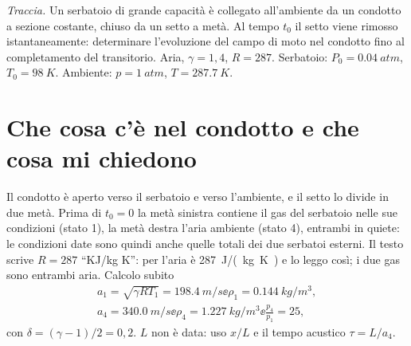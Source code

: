 

\graphicspath{{../../svolgimenti/1975-01-01_E01_condotto_serbatoio_ambiente/figure/}}

\newcommand{\uma}{u-a}
\newcommand{\upa}{u+a}



\maketitle

\emph{Traccia.} Un serbatoio di grande capacità è collegato all'ambiente da un condotto a sezione costante, chiuso
da un setto a metà. Al tempo $t_0$ il setto viene rimosso istantaneamente: determinare l'evoluzione del campo di
moto nel condotto fino al completamento del transitorio. Aria, $\gamma=1{,}4$, $R=287$. Serbatoio:
$P_0=\SI{0.04}{atm}$, $T_0=\SI{98}{K}$. Ambiente: $p=\SI{1}{atm}$, $T=\SI{287.7}{K}$.

\section*{Che cosa c'è nel condotto e che cosa mi chiedono}
Il condotto è aperto verso il serbatoio e verso l'ambiente, e il setto lo divide in due metà. Prima di $t_0=0$ la
metà sinistra contiene il gas del serbatoio nelle sue condizioni (stato 1), la metà destra l'aria ambiente (stato 4),
entrambi in quiete: le condizioni date sono quindi anche quelle totali dei due serbatoi esterni. Il testo scrive
$R=287$ ``KJ/kg K'': per l'aria è \SI{287}{J/(kg.K)} e lo leggo così; i due gas sono entrambi aria. Calcolo subito
\begin{gather*}
  a_1=\sqrt{\gamma RT_1}=\SI{198.4}{m/s} \ee \rho_1=\SI{0.144}{kg/m^3},\\
  a_4=\SI{340.0}{m/s} \ee \rho_4=\SI{1.227}{kg/m^3} \ee \frac{p_4}{p_1}=25,
\end{gather*}
con $\delta=(\gamma-1)/2=0{,}2$. $L$ non è data: uso $x/L$ e il tempo acustico $\tau=L/a_4$.

